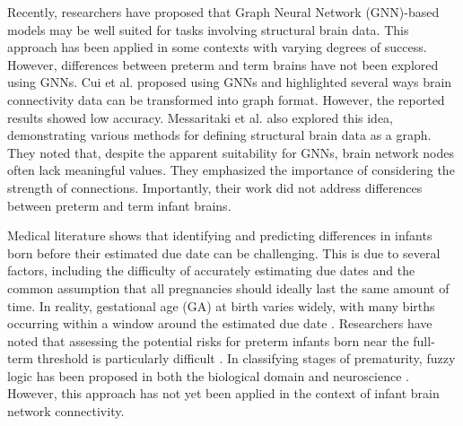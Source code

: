 \documentclass[doubleblind]{ecai}
\begin{document}
Recently, researchers have proposed that Graph Neural Network (GNN)-based models may be well suited for tasks involving structural brain data. This approach has been applied in some contexts with varying degrees of success. However, differences between preterm and term brains have not been explored using GNNs. Cui et al. \cite{cui2022braingb} proposed using GNNs and highlighted several ways brain connectivity data can be transformed into graph format. However, the reported results showed low accuracy. Messaritaki et al. \cite{messaritaki2019optimization} also explored this idea, demonstrating various methods for defining structural brain data as a graph. They noted that, despite the apparent suitability for GNNs, brain network nodes often lack meaningful values. They emphasized the importance of considering the strength of connections. Importantly, their work did not address differences between preterm and term infant brains.

Medical literature shows that identifying and predicting differences in infants born before their estimated due date can be challenging. This is due to several factors, including the difficulty of accurately estimating due dates and the common assumption that all pregnancies should ideally last the same amount of time. In reality, gestational age (GA) at birth varies widely, with many births occurring within a window around the estimated due date \cite{jukic2013length}. Researchers have noted that assessing the potential risks for preterm infants born near the full-term threshold is particularly difficult \cite{moutquin2003classification, engle2006recommendation, karnati2020late}. In classifying stages of prematurity, fuzzy logic has been proposed in both the biological domain \cite{vlamou2019fuzzy, pappas2006biological, cao2024fuzzy} and neuroscience \cite{godil2011fuzzy, munir2019neuroscience}. However, this approach has not yet been applied in the context of infant brain network connectivity.
\end{document}
